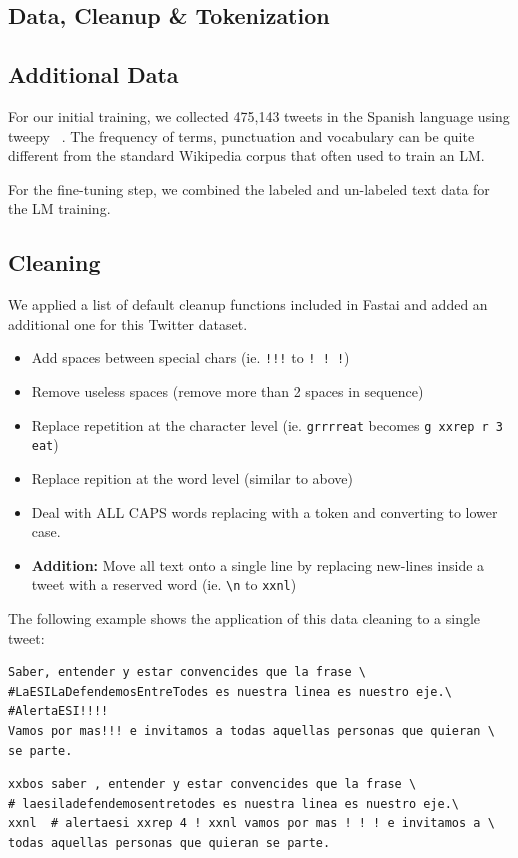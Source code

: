 \documentclass[smallcondensed]{svjour3}     %
\begin{document}
\subsection{Data, Cleanup \& Tokenization}
\label{sec:datacleaning}
\subsection{Additional Data}
For our initial training, we  collected 475,143 tweets in the Spanish language using tweepy ~\cite{Tweepy}.  The frequency of terms, punctuation and vocabulary can be quite different from the standard Wikipedia corpus that often used to train an LM.

For the fine-tuning step, we combined the labeled and un-labeled text data for the LM training.
\subsection{Cleaning}
We applied a list of default cleanup functions included in Fastai and added an additional one for this Twitter dataset.
\begin{itemize}
	\item Add spaces between special chars (ie. \verb|!!!| to \verb|! ! !|)
	\item Remove useless spaces (remove more than 2 spaces in sequence)
	\item Replace repetition at the character level (ie. \verb|grrrreat| becomes \verb|g xxrep r 3 eat|)
	\item Replace repition at the word level (similar to above)
	\item Deal with ALL CAPS words replacing with a token and converting to lower case.
	\item \textbf{Addition:} Move all text onto a single line by replacing new-lines inside a tweet with a reserved word (ie. \verb|\n| to \verb|xxnl|)
\end{itemize} 
The following example shows the application of this data cleaning to a single tweet:
\begin{verbatim} 
Saber, entender y estar convencides que la frase \
#LaESILaDefendemosEntreTodes es nuestra linea es nuestro eje.\
#AlertaESI!!!!
Vamos por mas!!! e invitamos a todas aquellas personas que quieran \
se parte.
\end{verbatim}

\begin{verbatim} 
xxbos saber , entender y estar convencides que la frase \
# laesiladefendemosentretodes es nuestra linea es nuestro eje.\
xxnl  # alertaesi xxrep 4 ! xxnl vamos por mas ! ! ! e invitamos a \
todas aquellas personas que quieran se parte.
\end{verbatim}
\end{document}

